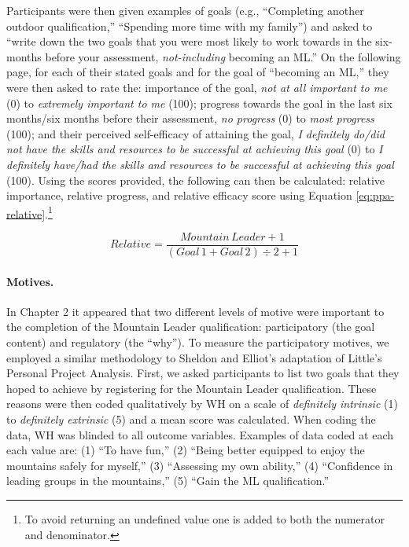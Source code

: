 \documentclass[
  12pt,
  a4paper,
]{book}
\begin{document}
Participants were then given examples of goals (e.g., ``Completing another outdoor qualification,'' ``Spending more time with my family'') and asked to ``write down the two goals that you were most likely to work towards in the six-months before your assessment, \emph{not-including} becoming an ML.'' On the following page, for each of their stated goals and for the goal of ``becoming an ML,'' they were then asked to rate the: importance of the goal, \emph{not at all important to me} (0) to \emph{extremely important to me} (100); progress towards the goal in the last six months/six months before their assessment, \emph{no progress} (0) to \emph{most progress} (100); and their perceived self-efficacy of attaining the goal, \emph{I definitely do/did not have the skills and resources to be successful at achieving this goal} (0) to \emph{I definitely have/had the skills and resources to be successful at achieving this goal} (100). Using the scores provided, the following can then be calculated: relative importance, relative progress, and relative efficacy score using Equation \eqref{eq:ppa-relative}.\footnote{To avoid returning an undefined value one is added to both the numerator and denominator.}

\begin{equation}
Relative = \frac{Mountain\,Leader + 1 }{(Goal\,1 + Goal\,2) \div 2 + 1}
\label{eq:ppa-relative}
\end{equation}

\hypertarget{motives.}{%
\paragraph{Motives.}\label{motives.}}

In Chapter 2 it appeared that two different levels of motive were important to the completion of the Mountain Leader qualification: participatory (the goal content) and regulatory (the ``why''). To measure the participatory motives, we employed a similar methodology to Sheldon and Elliot's \citeyearpar{Sheldon1999} adaptation of Little's \citeyearpar{Little1983} Personal Project Analysis. First, we asked participants to list two goals that they hoped to achieve by registering for the Mountain Leader qualification. These reasons were then coded qualitatively by WH on a scale of \emph{definitely intrinsic} (1) to \emph{definitely extrinsic} (5) and a mean score was calculated. When coding the data, WH was blinded to all outcome variables. Examples of data coded at each each value are: (1) ``To have fun,'' (2) ``Being better equipped to enjoy the mountains safely for myself,'' (3) ``Assessing my own ability,'' (4) ``Confidence in leading groups in the mountains,'' (5) ``Gain the ML qualification.''
\end{document}
